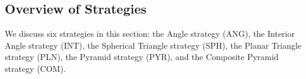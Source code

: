 
\subsection{Overview of Strategies}\label{subsec:strat}
We discuss six strategies in this section: the Angle strategy (ANG), the Interior Angle strategy (INT), the Spherical Triangle strategy (SPH), the Planar Triangle strategy (PLN), the Pyramid strategy (PYR), and the Composite Pyramid strategy (COM).

